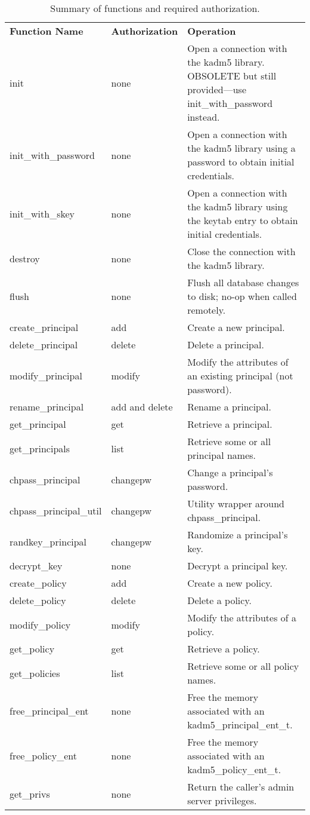 \begin{table}[htbp]
\caption{Summary of functions and required authorization.}
\label{tab:func-overview}
\begin{tabular}{@{}llp{3.24in}}
\\
{\bf Function Name} & {\bf Authorization} & {\bf Operation} \\

init & none & Open a connection with the kadm5 library.  OBSOLETE
but still provided---use init_with_password instead. \\
init_with_password & none & Open a connection with the kadm5
library using a password to obtain initial credentials. \\
init_with_skey & none & Open a connection with the kadm5 library
using the keytab entry to obtain initial credentials. \\
destroy & none & Close the connection with the kadm5 library. \\
flush & none & Flush all database changes to disk; no-op when called
remotely. \\
create_principal & add & Create a new principal. \\
delete_principal & delete & Delete a principal. \\
modify_principal & modify & Modify the attributes of an existing
        principal (not password). \\
rename_principal & add and delete & Rename a principal. \\
get_principal & get\footnotemark & Retrieve a principal. \\
get_principals & list & Retrieve some or all principal names. \\
chpass_principal & changepw\footnotemark[\thefootnote] &
         Change a principal's password. \\
chpass_principal_util & changepw\footnotemark[\thefootnote] & Utility wrapper around chpass_principal. \\
randkey_principal & changepw\footnotemark[\thefootnote] &
        Randomize a principal's key. \\
decrypt_key & none & Decrypt a principal key. \\
create_policy & add & Create a new policy. \\
delete_policy & delete & Delete a policy. \\
modify_policy & modify & Modify the attributes of a policy. \\
get_policy & get & Retrieve a policy. \\
get_policies & list & Retrieve some or all policy names. \\
free_principal_ent & none & Free the memory associated with an
                kadm5_principal_ent_t. \\
free_policy_ent & none & Free the memory associated with an
                kadm5_policy_ent_t. \\
get_privs & none & Return the caller's admin server privileges.
\end{tabular}
\end{table}

